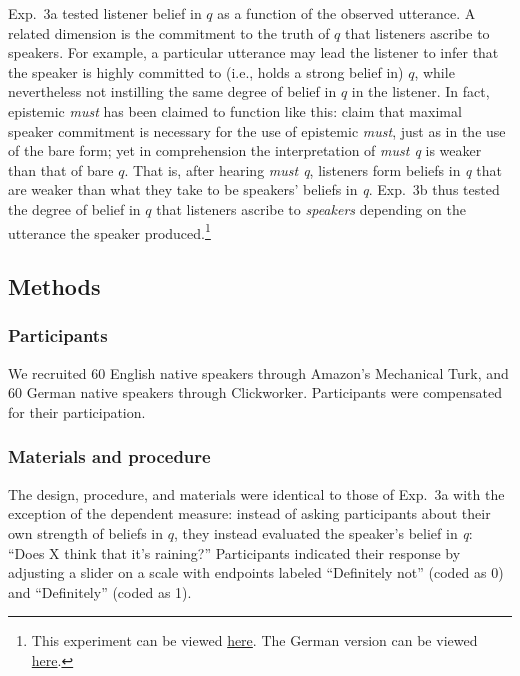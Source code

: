 \documentclass[11pt]{article}
\begin{document}
Exp.~3a tested listener belief in $q$ as a function of the observed utterance. A related dimension is the commitment to the truth of $q$ that listeners ascribe to speakers. For example, a particular utterance may lead the listener to infer that the speaker is highly committed to (i.e., holds a strong belief in) $q$, while nevertheless not instilling the same degree of belief in $q$ in the listener. In fact, epistemic \emph{must} has been claimed to function like this: \cite{vonfintelgillies2010} claim that maximal speaker commitment is necessary for the use of epistemic \emph{must}, just as in the use of the bare form; yet in comprehension the interpretation of \emph{must q} is weaker than that of bare $q$. That is, after hearing \emph{must q}, listeners form beliefs in \emph{q} that are weaker than what they take to be speakers' beliefs in \emph{q}.  Exp.~3b thus tested the degree of belief in $q$ that listeners ascribe to \emph{speakers} depending on the utterance the speaker produced.\footnote{This experiment can be viewed \href{http://stanford.edu/~jdegen/80_modals_comprehension_speakerbelief/modals.html}{here}. The German version can be viewed \href{http://web.stanford.edu/~jdegen/cgi-bin/1_dp_comprehension_speakerbelief/discourse_particles.html}{here}.}

\subsection{Methods}

\subsubsection{Participants}

We recruited 60 English native speakers through Amazon's Mechanical Turk, and 60 German native speakers through Clickworker. Participants were compensated for their participation.

\subsubsection{Materials and procedure}

The design, procedure, and materials were identical to those of Exp.~3a with the exception of the dependent measure: instead of asking participants about their own strength of beliefs in $q$, they instead evaluated the speaker's belief in \emph{q}: ``Does X think that it's raining?'' Participants indicated their response by adjusting a slider on a scale with endpoints labeled ``Definitely not'' (coded as 0) and ``Definitely'' (coded as 1). 
\end{document}
